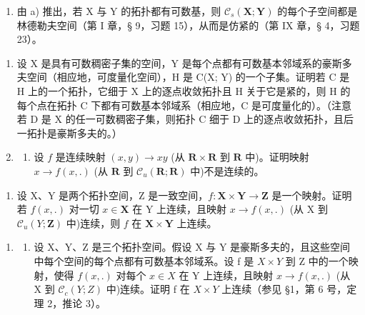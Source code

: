 \begin{enumerate}
\def\labelenumi{\alph{enumi})}
\setcounter{enumi}{1}
\tightlist
\item
  由 a) 推出，若 X 与 Y 的拓扑都有可数基，则 \(\mathcal{C}_{s}(\mathbf{X};\mathbf{Y})\) 的每个子空间都是林德勒夫空间（第 I 章，§ 9，习题 15），从而是仿紧的（第 IX 章，§ 4，习题 23）。
\end{enumerate}

\begin{enumerate}
\def\labelenumi{\arabic{enumi})}
\setcounter{enumi}{6}
\item
  设 X 是具有可数稠密子集的空间，Y 是每个点都有可数基本邻域系的豪斯多夫空间（相应地，可度量化空间），H 是 C(X; Y) 的一个子集。证明若 C 是 H 上的一个拓扑，它细于 X 上的逐点收敛拓扑且 H 关于它是紧的，则 H 的每个点在拓扑 C 下都有可数基本邻域系（相应地，C 是可度量化的）。（注意若 D 是 X 的任一可数稠密子集，则拓扑 C 细于 D 上的逐点收敛拓扑，且后一拓扑是豪斯多夫的。）
\item
  \begin{enumerate}
  \def\labelenumii{\alph{enumii})}
  \tightlist
  \item
    设 \(f\) 是连续映射 \((x, y) \to xy\) (从 \(\mathbf{R} \times \mathbf{R}\) 到 \(\mathbf{R}\) 中)。证明映射 \(x \to f(x, .)\) (从 \(\mathbf{R}\) 到 \(\mathcal{C}_u(\mathbf{R}; \mathbf{R})\) 中)不是连续的。
  \end{enumerate}
\end{enumerate}

\begin{enumerate}
\def\labelenumi{\alph{enumi})}
\setcounter{enumi}{1}
\tightlist
\item
  设 X、Y 是两个拓扑空间，Z 是一致空间，\(f: \mathbf{X} \times \mathbf{Y} \to \mathbf{Z}\) 是一个映射。证明若 \(f(x, .)\) 对一切 \(x \in \mathbf{X}\) 在 Y 上连续，且映射 \(x \to f(x, .)\) (从 X 到 \(\mathcal{C}_u(Y; \mathbf{Z})\) 中)连续，则 \(f\) 在 \(\mathbf{X} \times \mathbf{Y}\) 上连续。
\end{enumerate}

\begin{enumerate}
\def\labelenumi{\arabic{enumi})}
\setcounter{enumi}{8}
\tightlist
\item
  \begin{enumerate}
  \def\labelenumii{\alph{enumii})}
  \tightlist
  \item
    设 X、Y、Z 是三个拓扑空间。假设 X 与 Y 是豪斯多夫的，且这些空间中每个空间的每个点都有可数基本邻域系。设 f 是 \(X \times Y\) 到 Z 中的一个映射，使得 \(f(x, .)\) 对每个 \(x \in X\) 在 Y 上连续，且映射 \(x \to f(x, .)\) (从 X 到 \(\mathcal{C}_{c}(Y; Z)\) 中)连续。证明 f 在 \(X \times Y\) 上连续（参见 §1，第 6 号，定理 2，推论 3）。
  \end{enumerate}
\end{enumerate}

